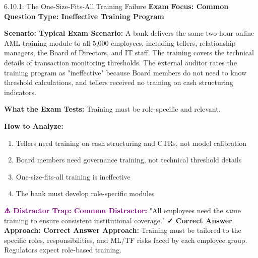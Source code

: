 \documentclass[11pt,a4paper]{beamer}
\newcommand{\examfocus}[1]{\textcolor{orange!80!black}{\textbf{Exam Focus: #1}}}
\newcommand{\trap}[1]{\textcolor{purple}{\textbf{⚠️ Distractor Trap: #1}}}
\newcommand{\correct}[1]{\textcolor{green!50!black}{\textbf{✓ Correct Answer Approach: #1}}}
\newcommand{\scenario}[1]{\textcolor{blue!70!black}{\textbf{Scenario: #1}}}
\begin{document}
	\begin{frame}{6.10.1: The One-Size-Fits-All Training Failure}
		\examfocus{Common Question Type: Ineffective Training Program}
		
		\scenario{Typical Exam Scenario:}
		A bank delivers the same two-hour online AML training module to all 5,000 employees, including tellers, relationship managers, the Board of Directors, and IT staff. The training covers the technical details of transaction monitoring thresholds. The external auditor rates the training program as "ineffective" because Board members do not need to know threshold calculations, and tellers received no training on cash structuring indicators.
		
		\textbf{What the Exam Tests:} Training must be role-specific and relevant.
		
		\textbf{How to Analyze:}
		\begin{enumerate}
			\item Tellers need training on cash structuring and CTRs, not model calibration
			\item Board members need governance training, not technical threshold details
			\item One-size-fits-all training is ineffective
			\item The bank must develop role-specific modules
		\end{enumerate}
		
		\trap{Common Distractor:} "All employees need the same training to ensure consistent institutional coverage."
		\correct{Correct Answer Approach:} Training must be tailored to the specific roles, responsibilities, and ML/TF risks faced by each employee group. Regulators expect role-based training.
	\end{frame}
	
\end{document}
